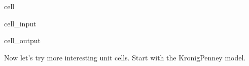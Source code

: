 \documentclass[letterpaper,10pt,english]{jupyterBook}
\begin{document}
\begin{sphinxuseclass}{cell}\begin{sphinxVerbatimInput}

\begin{sphinxuseclass}{cell_input}
\begin{sphinxVerbatim}[commandchars=\\\{\}]
      
   
    \PYG{p}{[}\PYG{p}{]}\PYG{p}{[}\PYG{p}{]}
\end{sphinxVerbatim}

\end{sphinxuseclass}\end{sphinxVerbatimInput}
\begin{sphinxVerbatimOutput}

\begin{sphinxuseclass}{cell_output}
\noindent{}

\end{sphinxuseclass}\end{sphinxVerbatimOutput}

\end{sphinxuseclass}
\sphinxAtStartPar
Now let’s try more interesting unit cells. Start with the Kronig\sphinxhyphen{}Penney model.
\end{document}
